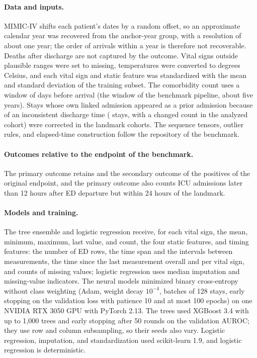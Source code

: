 \paragraph{Data and inputs.} MIMIC-IV shifts each patient's dates by a random offset, so an approximate calendar year was recovered from the anchor-year group, with a resolution of about one year; the order of arrivals within a year is therefore not recoverable. Deaths after discharge are not captured by the outcome. Vital signs outside plausible ranges were set to missing, temperatures were converted to degrees Celsius, and each vital sign and static feature was standardized with the mean and standard deviation of the training subset. The comorbidity count uses a window of \RVElixWindowDays{} days before arrival (the window of the benchmark pipeline, about five years). Stays whose own linked admission appeared as a prior admission because of an inconsistent discharge time (\RVOwnAdmissionStays{} stays, \RVOwnAdmissionCohortChanged{} with a changed count in the analyzed cohort) were corrected in the landmark cohorts. The sequence tensors, outlier rules, and elapsed-time construction follow the repository of the benchmark.

\paragraph{Outcomes relative to the endpoint of the benchmark.} The primary outcome retains \RVRetainedPrimary{} and the secondary outcome \RVRetainedSecondary{} of the \RVOriginalPositivesTotal{} positives of the original endpoint, and the primary outcome also counts \RVOverlapPrimaryOnly{} ICU admissions later than 12 hours after ED departure but within 24 hours of the landmark.

\paragraph{Models and training.} The tree ensemble and logistic regression receive, for each vital sign, the mean, minimum, maximum, last value, and count, the four static features, and timing features: the number of ED rows, the time span and the intervals between measurements, the time since the last measurement overall and per vital sign, and counts of missing values; logistic regression uses median imputation and missing-value indicators. The neural models minimized binary cross-entropy without class weighting (Adam, weight decay $10^{-4}$, batches of 128 stays, early stopping on the validation loss with patience 10 and at most 100 epochs) on one NVIDIA RTX 3050 GPU with PyTorch 2.13. The trees used XGBoost 3.4 with up to 1,000 trees and early stopping after 50 rounds on the validation AUROC; they use row and column subsampling, so their seeds also vary. Logistic regression, imputation, and standardization used scikit-learn 1.9, and logistic regression is deterministic.

